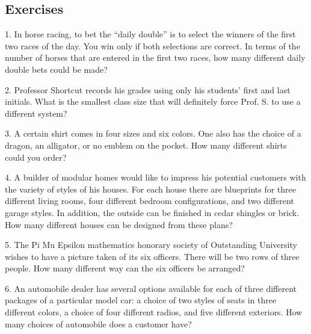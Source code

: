 \documentclass[10pt,]{book}
\theoremstyle{plain}
\theoremstyle{definition}
\begin{document}
\subsection[Exercises]{Exercises}\label{EXERCISES-FOR-SECTION-2-1}
\hypertarget{exercisegroup-10}{}\begin{exercisegroup}
\item[1.]\hypertarget{exercise-42}{} In horse racing, to bet the ``daily double'' is to select the winners of the first two races of the day. You win only if both selections are correct. In terms of the number of horses that are entered in the first two races, how many different daily double bets could be made?\par\smallskip
\item[2.]\hypertarget{exercise-43}{} Professor Shortcut records his grades using only his students' first and last initials. What is the smallest class size that will definitely force Prof. S. to use a different system?\par\smallskip
\item[3.]\hypertarget{exercise-44}{} A certain shirt comes in four sizes and six colors. One also has the choice of a dragon, an alligator, or no emblem on the pocket. How many different shirts could you order?\par\smallskip
\item[4.]\hypertarget{exercise-45}{} A builder of modular homes would like to impress his potential customers with the variety of styles of his houses. For each house there are blueprints for three different living rooms, four different bedroom configurations, and two different garage styles. In addition, the outside can be finished in cedar shingles or brick. How many different houses can be designed from these plans?\par\smallskip
\item[5.]\hypertarget{exercise-46}{} The Pi Mu Epsilon mathematics honorary society of Outstanding University wishes to have a picture taken of its six officers. There will be two rows of three people. How many different way can the six officers be arranged?\par\smallskip
\item[6.]\hypertarget{exercise-47}{}  An automobile dealer has several options available for each of three different packages of a particular model car: a choice of two styles of seats in three different colors, a choice of four different radios, and five different exteriors. How many choices of automobile does a customer have?\par\smallskip

\end{exercisegroup}
\end{document}
